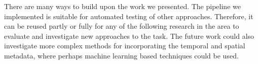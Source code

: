There are many ways to build upon the work we presented. The pipeline we implemented is suitable for automated testing of other approaches. Therefore, it can be reused partly or fully for any of the following research in the area to evaluate and investigate new approaches to the \reid{} task. The future work could also investigate more complex methods for incorporating the temporal and spatial metadata, where perhaps machine learning based techniques could be used. 



